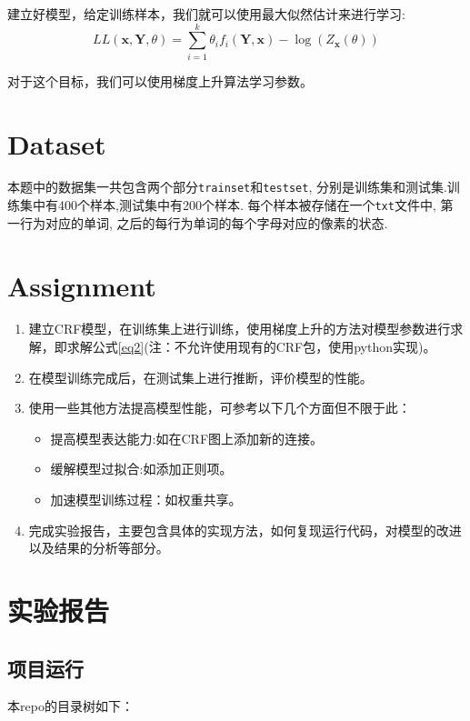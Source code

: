 \documentclass[a4paper,UTF8]{article}
\numberwithin{equation}{section}
\begin{document}
建立好模型，给定训练样本，我们就可以使用最大似然估计来进行学习:
\begin{equation}
    LL(\mathbf{x},\mathbf{Y},\theta) =\sum_{i=1}^{k} \theta_{i} f_{i}(\mathbf{Y}, \mathbf{x}) -\log \left(Z_{\mathbf{x}}(\theta)\right)\label{eq2}
\end{equation}

对于这个目标，我们可以使用梯度上升算法学习参数。

\section{Dataset}
本题中的数据集一共包含两个部分\texttt{trainset}和\texttt{testset}, 分别是训练集和测试集.训练集中有400个样本,测试集中有200个样本. 每个样本被存储在一个\texttt{txt}文件中, 第一行为对应的单词, 之后的每行为单词的每个字母对应的像素的状态.

\section{Assignment}
\begin{enumerate}
    \item 建立CRF模型，在训练集上进行训练，使用梯度上升的方法对模型参数进行求解，即求解公式\eqref{eq2}(注：不允许使用现有的CRF包，使用python实现)。
    \item 在模型训练完成后，在测试集上进行推断，评价模型的性能。
    \item 使用一些其他方法提高模型性能，可参考以下几个方面但不限于此：
    \begin{itemize}
        \item 提高模型表达能力:如在CRF图上添加新的连接。
        \item 缓解模型过拟合:如添加正则项。
        \item 加速模型训练过程：如权重共享。
    \end{itemize}
    \item 完成实验报告，主要包含具体的实现方法，如何复现运行代码，对模型的改进以及结果的分析等部分。
\end{enumerate}
\section {实验报告}
\subsection{项目运行}
本repo的目录树如下：

\begin{minipage}{\linewidth}
\end{minipage}
\end{document}
